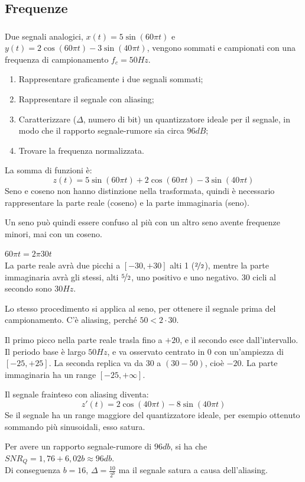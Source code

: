 \subsection{Frequenze}
\subsubsection{}
Due segnali analogici, $x(t) = 5\sin(60\pi t)$ e $y(t) = 2\cos(60\pi t) - 3\sin(40\pi t)$, vengono sommati e campionati con una frequenza di campionamento $f_c = 50 Hz$. 
\begin{enumerate}
	\item Rappresentare graficamente i due segnali sommati;
	\item Rappresentare il segnale con aliasing;
	\item Caratterizzare ($\Delta$, numero di bit) un quantizzatore ideale per il segnale, in modo che il rapporto segnale-rumore sia circa $96 dB$;
	\item Trovare la frequenza normalizzata.
\end{enumerate}
La somma di funzioni è:
$$z(t) = 5\sin(60\pi t) + 2\cos(60\pi t) - 3\sin(40\pi t)$$
Seno e coseno non hanno distinzione nella trasformata, quindi è necessario rappresentare la parte reale (coseno) e la parte immaginaria (seno). 

Un seno può quindi essere confuso al più con un altro seno avente frequenze minori, mai con un coseno.

$60\pi t = 2\pi 30t$ \\
La parte reale avrà due picchi a $[-30, +30]$ alti 1 ($\nicefrac{2}{2}$), mentre la parte immaginaria avrà gli stessi, alti $\nicefrac{5}{2}$, uno positivo e uno negativo. 30 cicli al secondo sono $30Hz$.

Lo stesso procedimento si applica al seno, per ottenere il segnale prima del campionamento. C'è aliasing, perché $50 < 2 \cdot 30$. 

Il primo picco nella parte reale trasla fino a $+20$, e il secondo esce dall'intervallo. Il periodo base è largo $50 Hz$, e va osservato centrato in 0 con un'ampiezza di $[-25, +25]$. La seconda replica va da 30 a $(30 - 50)$, cioè $-20$. La parte immaginaria ha un range $[-25, +\infty]$.

Il segnale frainteso con aliasing diventa:
$$z'(t) = 2\cos(40\pi t) - 8\sin(40\pi t)$$
Se il segnale ha un range maggiore del quantizzatore ideale, per esempio ottenuto sommando più sinusoidali, esso satura.

Per avere un rapporto segnale-rumore di $96 db$, si ha che $SNR_Q = 1,76 + 6,02b \approx 96db$. \\
Di conseguenza $b = 16$, $\Delta = \frac{10}{2^b}$ ma il segnale satura a causa dell'aliasing.

